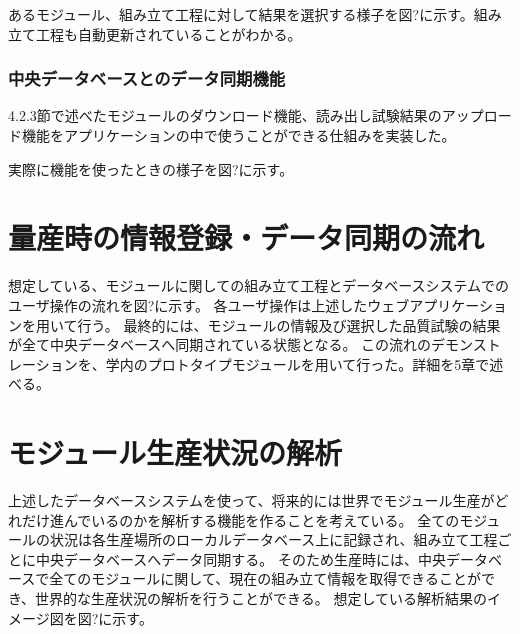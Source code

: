あるモジュール、組み立て工程に対して結果を選択する様子を図?に示す。組み立て工程も自動更新されていることがわかる。

\subsubsection{中央データベースとのデータ同期機能}
4.2.3節で述べたモジュールのダウンロード機能、読み出し試験結果のアップロード機能をアプリケーションの中で使うことができる仕組みを実装した。

実際に機能を使ったときの様子を図?に示す。


\section{量産時の情報登録・データ同期の流れ}
想定している、モジュールに関しての組み立て工程とデータベースシステムでのユーザ操作の流れを図?に示す。
各ユーザ操作は上述したウェブアプリケーションを用いて行う。
最終的には、モジュールの情報及び選択した品質試験の結果が全て中央データベースへ同期されている状態となる。
この流れのデモンストレーションを、学内のプロトタイプモジュールを用いて行った。詳細を5章で述べる。

\section{モジュール生産状況の解析}
上述したデータベースシステムを使って、将来的には世界でモジュール生産がどれだけ進んでいるのかを解析する機能を作ることを考えている。
全てのモジュールの状況は各生産場所のローカルデータベース上に記録され、組み立て工程ごとに中央データベースへデータ同期する。
そのため生産時には、中央データベースで全てのモジュールに関して、現在の組み立て情報を取得できることができ、世界的な生産状況の解析を行うことができる。
想定している解析結果のイメージ図を図?に示す。
